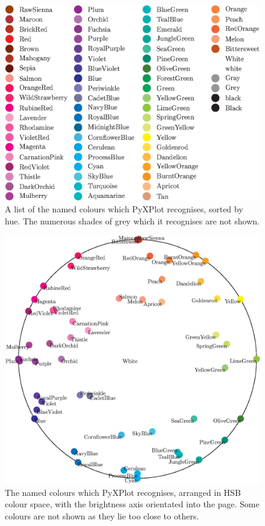 \begin{figure}
\begin{center}
\includegraphics[width=\textwidth]{figures/pyx_colours3.eps}
\end{center}
\caption{A list of the named colours which PyXPlot recognises, sorted by hue. The numerous shades of grey which it recognises are not shown.}
\label{fig:colour_table2}
\end{figure}

\begin{figure}
\begin{center}
\includegraphics[width=\textwidth]{figures/pyx_colours.eps}
\end{center}
\caption{The named colours which PyXPlot recognises, arranged in HSB colour space, with the brightness axis orientated into the page. Some colours are not shown as they lie too close to others.}
\label{fig:colour_table3}
\end{figure}

